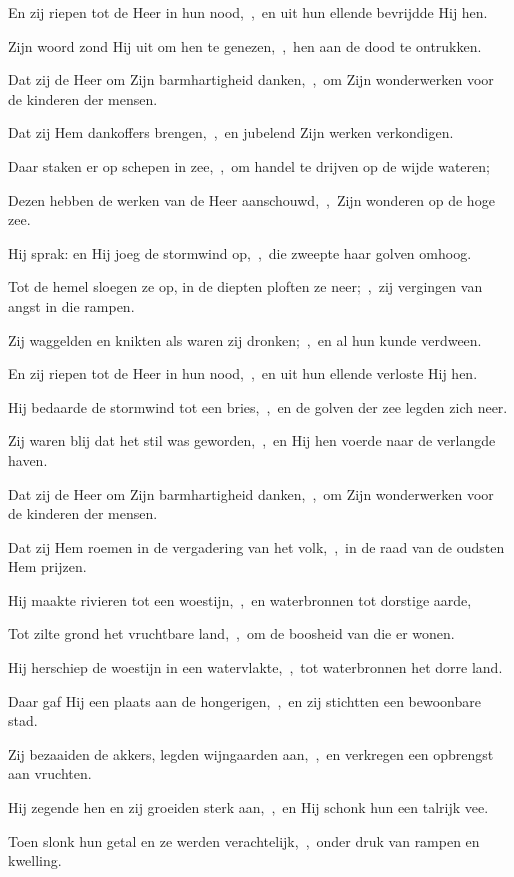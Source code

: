 \documentclass[12pt,twoside,a5paper]{article}
\begin{document}
\begin{halfparskip}
  En zij riepen tot de Heer in hun nood,~\sep\ en uit hun ellende bevrijdde Hij hen.

  Zijn woord zond Hij uit om hen te genezen,~\sep\ hen aan de dood te ontrukken.

  Dat zij de Heer om Zijn barmhartigheid danken,~\sep\ om Zijn wonderwerken voor de kinderen der mensen.

  Dat zij Hem dankoffers brengen,~\sep\ en jubelend Zijn werken verkondigen.

  Daar staken er op schepen in zee,~\sep\ om handel te drijven op de wijde wateren;

  Dezen hebben de werken van de Heer aanschouwd,~\sep\ Zijn wonderen op de hoge zee.

  Hij sprak: en Hij joeg de stormwind op,~\sep\ die zweepte haar golven omhoog.

  Tot de hemel sloegen ze op, in de diepten ploften ze neer;~\sep\ zij vergingen van angst in die rampen.

  Zij waggelden en knikten als waren zij dronken;~\sep\ en al hun kunde verdween.

  En zij riepen tot de Heer in hun nood,~\sep\ en uit hun ellende verloste Hij hen.

  Hij bedaarde de stormwind tot een bries,~\sep\ en de golven der zee legden zich neer.

  Zij waren blij dat het stil was geworden,~\sep\ en Hij hen voerde naar de verlangde haven.

  Dat zij de Heer om Zijn barmhartigheid danken,~\sep\ om Zijn wonderwerken voor de kinderen der mensen.

  Dat zij Hem roemen in de vergadering van het volk,~\sep\ in de raad van de oudsten Hem prijzen.

  Hij maakte rivieren tot een woestijn,~\sep\ en waterbronnen tot dorstige aarde,

  Tot zilte grond het vruchtbare land,~\sep\ om de boosheid van die er wonen.

  Hij herschiep de woestijn in een watervlakte,~\sep\ tot waterbronnen het dorre land.

  Daar gaf Hij een plaats aan de hongerigen,~\sep\ en zij stichtten een bewoonbare stad.

  Zij bezaaiden de akkers, legden wijngaarden aan,~\sep\ en verkregen een opbrengst aan vruchten.

  Hij zegende hen en zij groeiden sterk aan,~\sep\ en Hij schonk hun een talrijk vee.

  Toen slonk hun getal en ze werden verachtelijk,~\sep\ onder druk van rampen en kwelling.


\end{halfparskip}
\end{document}
